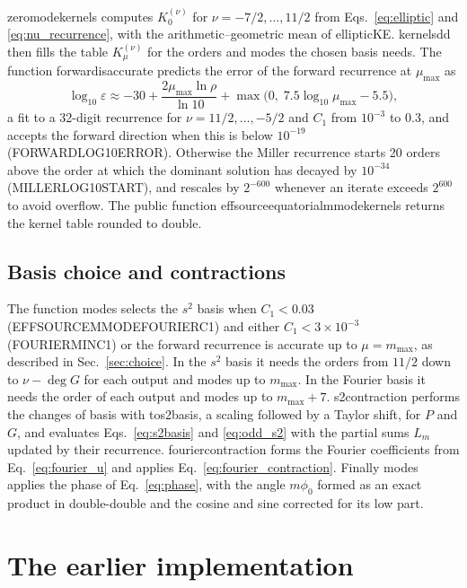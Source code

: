 \documentclass[11pt]{article}
\newcommand{\Kmn}[2]{K_{#1}^{(#2)}}
\newcommand{\codeus}{\textunderscore\allowbreak}
\newcommand{\codehy}{-\allowbreak}
\newcommand{\code}[1]{{\ttfamily\let\_\codeus\let\-\codehy #1}}
\begin{document}
\code{zero\_mode\_kernels} computes $\Kmn{0}{\nu}$ for
$\nu=-7/2,\dots,11/2$ from Eqs.~\eqref{eq:elliptic} and
\eqref{eq:nu_recurrence}, with the arithmetic--geometric mean of
\code{elliptic\_KE}. \code{kernels\_dd} then fills the table
$\Kmn{\mu}{\nu}$ for the orders and modes the chosen basis needs. The function
\code{forward\_is\_accurate} predicts the error of the forward recurrence at
$\mu_{\max}$ as
\begin{equation}
  \label{eq:forward_fit}
  \log_{10}\varepsilon \approx -30 + \frac{2\mu_{\max}\ln\rho}{\ln10}
    + \max\bigl(0,\;7.5\log_{10}\mu_{\max}-5.5\bigr),
\end{equation}
a fit to a 32-digit recurrence for $\nu=11/2,\dots,-5/2$ and $C_1$ from
$10^{-3}$ to $0.3$, and accepts the forward direction when this is below
$10^{-19}$ (\code{FORWARD\_LOG10\_ERROR}). Otherwise the Miller recurrence
starts 20 orders above the order at which the dominant solution has decayed by
$10^{-34}$ (\code{MILLER\_LOG10\_START}), and rescales by $2^{-600}$ whenever an
iterate exceeds $2^{600}$ to avoid overflow. The public function
\code{effsource\_equatorial\_mmode\_kernels} returns the kernel table rounded
to double.

\subsection{Basis choice and contractions}

The function \code{modes} selects the $s^2$ basis when $C_1<0.03$
(\code{EFFSOURCE\_MMODE\_FOURIER\_C1}) and either $C_1<3\times10^{-3}$
(\code{FOURIER\_MIN\_C1}) or the forward recurrence is accurate up to
$\mu=m_{\max}$, as described in Sec.~\ref{sec:choice}. In the
$s^2$ basis it needs the orders from $11/2$ down to $\nu-\deg G$ for each output
and modes up to $m_{\max}$. In the Fourier basis it needs the order of each
output and modes up to $m_{\max}+7$. \code{s2\_contraction} performs the
changes of basis with \code{to\_s2\_basis}, a scaling followed by a Taylor
shift, for $P$ and $G$, and evaluates Eqs.~\eqref{eq:s2basis} and
\eqref{eq:odd_s2} with the partial sums $L_m$ updated by their recurrence.
\code{fourier\_contraction} forms the Fourier coefficients from
Eq.~\eqref{eq:fourier_u} and applies Eq.~\eqref{eq:fourier_contraction}.
Finally \code{modes} applies the phase of Eq.~\eqref{eq:phase}, with the angle
$m\phi_0$ formed as an exact product in double-double and the cosine and sine
corrected for its low part.

\section{The earlier implementation}
\label{sec:old}
\end{document}

